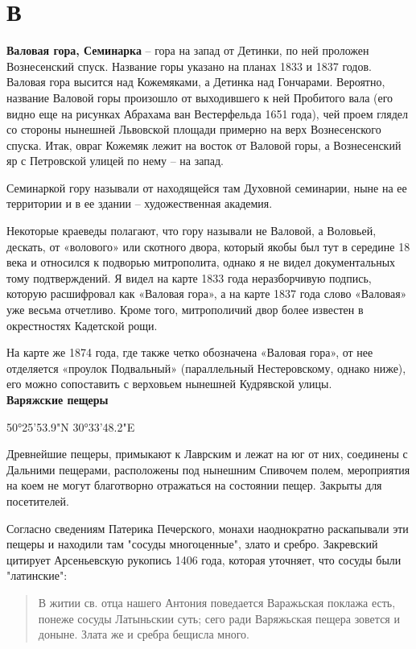 \chapter*{В}

\textbf{Валовая гора, Семинарка} – гора на запад от Детинки, по ней проложен Вознесенский спуск. Название горы указано на планах 1833 и 1837 годов. Валовая гора высится над Кожемяками, а Детинка над Гончарами. Вероятно, название Валовой горы произошло от выходившего к ней Пробитого вала (его видно еще на рисунках Абрахама ван Вестерфельда 1651 года), чей проем глядел со стороны нынешней Львовской площади примерно на верх Вознесенского спуска. Итак, овраг Кожемяк лежит на восток от Валовой горы, а Вознесенский яр с Петровской улицей по нему – на запад.

Семинаркой гору называли от находящейся там Духовной семинарии, ныне на ее территории и в ее здании – художественная академия.

Некоторые краеведы полагают, что гору называли не Валовой, а Воловьей, дескать, от «волового» или скотного двора, который якобы был тут в середине 18 века и относился к подворью митрополита, однако я не видел документальных тому подтверждений. Я видел на карте 1833 года неразборчивую подпись, которую расшифровал как «Валовая гора», а на карте 1837 года слово «Валовая» уже весьма отчетливо. Кроме того, митрополичий двор более известен в окрестностях Кадетской рощи.

На карте же 1874 года, где также четко обозначена «Валовая гора», от нее отделяется «проулок Подвальный» (параллельный Нестеровскому, однако ниже), его можно сопоставить с верховьем нынешней Кудрявской улицы.\\

\textbf{Варяжские пещеры}

50°25'53.9"N 30°33'48.2"E

Древнейшие пещеры, примыкают к Лаврским и лежат на юг от них, соединены с Дальними пещерами, расположены под нынешним Спивочем полем, мероприятия на коем не могут благотворно отражаться на состоянии пещер. Закрыты для посетителей.

Согласно сведениям Патерика Печерского, монахи наоднократно раскапывали эти пещеры и находили там "сосуды многоценные", злато и сребро. Закревский цитирует Арсеньевскую рукопись 1406 года, которая уточняет, что сосуды были "латинские":

\begin{quotation}
В житии св. отца нашего Антония поведается Варажьская поклажа есть, понеже сосуды Латыньскии суть; сего ради Варяжьская пещера зовется и доныне. Злата же и сребра бещисла много.\end{quotation}




